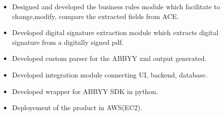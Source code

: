 \documentclass[a4paper]{article}
\begin{document}
\begin{itemize} \itemsep 1pt
	\item Designed and developed the business rules module which facilitate to change,modify, compare the extracted fields from ACE.
	\item Developed digital signature extraction module which extracts digital signature from a digitally signed pdf.
    \item Developed custom parser for the ABBYY xml output generated.   
    \item Developed integration module connecting UI, backend, database.
    \item Developed wrapper for ABBYY SDK in python.
    \item Deployement of the product in AWS(EC2).
\end{itemize}
\end{document}
